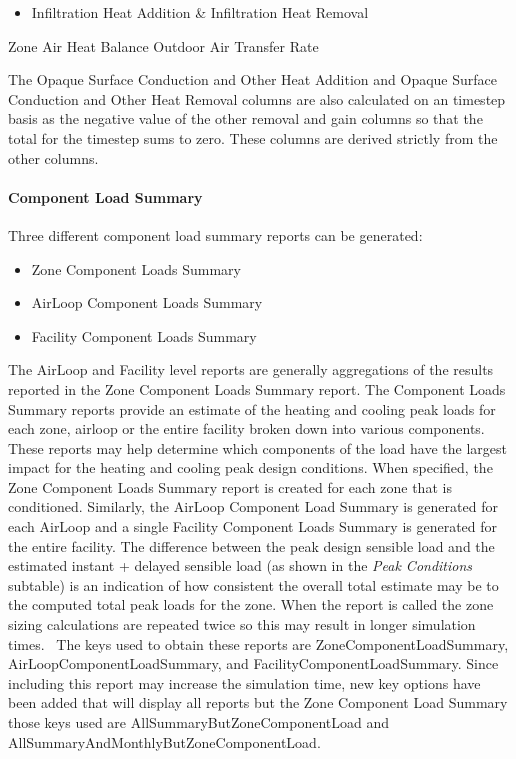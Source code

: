 \begin{itemize}
\tightlist
\item
  Infiltration Heat Addition \& Infiltration Heat Removal
\end{itemize}

Zone Air Heat Balance Outdoor Air Transfer Rate

The Opaque Surface Conduction and Other Heat Addition and Opaque Surface Conduction and Other Heat Removal columns are also calculated on an timestep basis as the negative value of the other removal and gain columns so that the total for the timestep sums to zero. These columns are derived strictly from the other columns.

\paragraph{Component Load Summary}\label{component-load-summary}

Three different component load summary reports can be generated:

\begin{itemize}
\tightlist
\item
  Zone Component Loads Summary
\item
  AirLoop Component Loads Summary
\item
  Facility Component Loads Summary
\end{itemize}

The AirLoop and Facility level reports are generally aggregations of the results reported in the Zone Component Loads Summary report. The Component Loads Summary reports provide an estimate of the heating and cooling peak loads for each zone, airloop or the entire facility broken down into various components. These reports may help determine which components of the load have the largest impact for the heating and cooling peak design conditions. When specified, the Zone Component Loads Summary report is created for each zone that is conditioned. Similarly, the AirLoop Component Load Summary is generated for each AirLoop and a single Facility Component Loads Summary is generated for the entire facility. The difference between the peak design sensible load and the estimated instant + delayed sensible load (as shown in the \emph{Peak Conditions} subtable) is an indication of how consistent the overall total estimate may be to the computed total peak loads for the zone. When the report is called the zone sizing calculations are repeated twice so this may result in longer simulation times.~ The keys used to obtain these reports are ZoneComponentLoadSummary, AirLoopComponentLoadSummary, and FacilityComponentLoadSummary. Since including this report may increase the simulation time, new key options have been added that will display all reports but the Zone Component Load Summary those keys used are AllSummaryButZoneComponentLoad and AllSummaryAndMonthlyButZoneComponentLoad.

